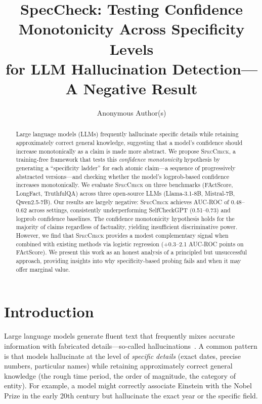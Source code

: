 \documentclass{article}
\title{SpecCheck: Testing Confidence Monotonicity Across Specificity Levels\\for LLM Hallucination Detection---A Negative Result}
\author{
  Anonymous Author(s)
}
\newcommand{\speccheck}{\textsc{SpecCheck}}
\begin{document}
\maketitle

\begin{abstract}
Large language models (LLMs) frequently hallucinate specific details while retaining approximately correct general knowledge, suggesting that a model's confidence should increase monotonically as a claim is made more abstract.
We propose \speccheck{}, a training-free framework that tests this \emph{confidence monotonicity} hypothesis by generating a ``specificity ladder'' for each atomic claim---a sequence of progressively abstracted versions---and checking whether the model's logprob-based confidence increases monotonically.
We evaluate \speccheck{} on three benchmarks (FActScore, LongFact, TruthfulQA) across three open-source LLMs (Llama-3.1-8B, Mistral-7B, Qwen2.5-7B).
Our results are largely negative: \speccheck{} achieves AUC-ROC of 0.48--0.62 across settings, consistently underperforming SelfCheckGPT (0.51--0.73) and logprob confidence baselines.
The confidence monotonicity hypothesis holds for the majority of claims regardless of factuality, yielding insufficient discriminative power.
However, we find that \speccheck{} provides a modest complementary signal when combined with existing methods via logistic regression (+0.3--2.1 AUC-ROC points on FActScore).
We present this work as an honest analysis of a principled but unsuccessful approach, providing insights into why specificity-based probing fails and when it may offer marginal value.
\end{abstract}

\section{Introduction}
\label{sec:intro}

Large language models generate fluent text that frequently mixes accurate information with fabricated details---so-called hallucinations~\citep{min2023factscore, manakul2023selfcheckgpt}.
A common pattern is that models hallucinate at the level of \emph{specific details} (exact dates, precise numbers, particular names) while retaining approximately correct general knowledge (the rough time period, the order of magnitude, the category of entity).
For example, a model might correctly associate Einstein with the Nobel Prize in the early 20th century but hallucinate the exact year or the specific field.
\end{document}
